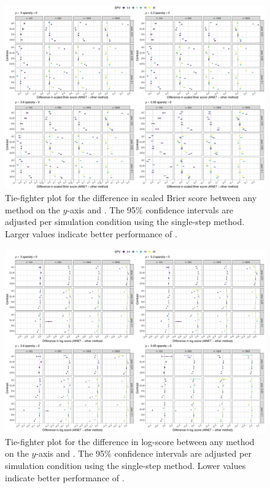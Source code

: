 \begin{subappendices}
\begin{landscape}
\begin{figure}[!ht]
\center
\includegraphics[width=0.9\linewidth]{images/paper6/figureS2.pdf}
\caption{Tie-fighter plot for the difference in scaled Brier score between any
  method on the $y$-axis and \ainet{}. The 95\% confidence intervals are adjusted
  per simulation condition using the single-step method. Larger
  values indicate better performance of \ainet{}. } \label{fig6:tiesbrier}
\end{figure}
\end{landscape}

\begin{landscape}
\begin{figure}[!ht]
\center
\includegraphics[width=0.9\linewidth]{images/paper6/figureS3.pdf}
\caption{Tie-fighter plot for the difference in log-score between any method on
  the $y$-axis and \ainet{}. The 95\% confidence intervals are adjusted per
  simulation condition using the single-step method. Lower values indicate
  better performance of \ainet{}. } \label{fig6:tienll}
\end{figure}
\end{landscape}


\end{subappendices}
